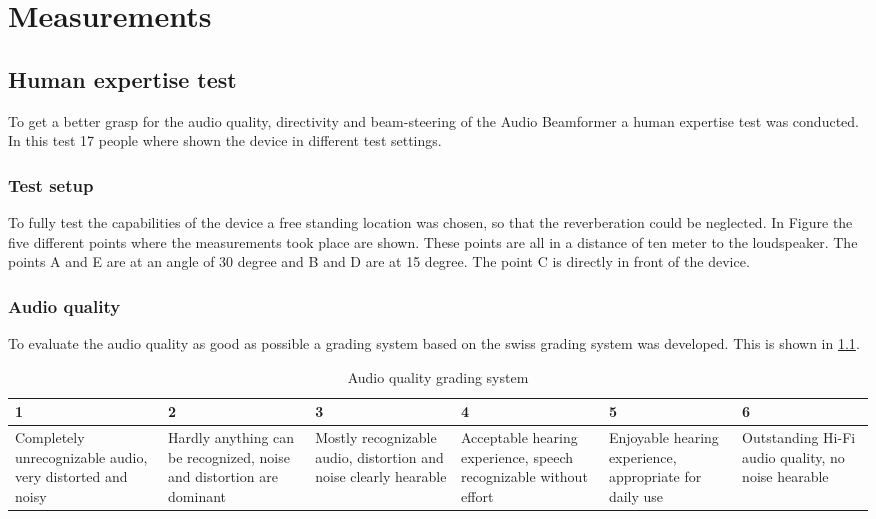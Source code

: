 \chapter{Measurements}
\section{Human expertise test}
To get a better grasp for the audio quality, directivity and beam-steering of the Audio Beamformer a human expertise test was conducted. In this test 17 people where shown the device in different test settings.
\subsection{Test setup}
To fully test the capabilities of the device a free standing location was chosen, so that the reverberation could be neglected. In Figure  the five different points where the measurements took place are shown. These points are all in a distance of ten meter to the loudspeaker. The points A and E are at an angle of 30 degree and B and D are at 15 degree. The point C is directly in front of the device.  
\subsection{Audio quality}
To evaluate the audio quality as good as possible a grading system based on the swiss grading system was developed. This is shown in \ref{6.1.2_tab:audio_quality}.

\begin{center}
\begin{table}
\centering
\begin{tabular}{ |m{2.2cm}|m{2.2cm}|m{2.2cm}|m{2.2cm}|m{2.2cm}|m{2.2cm}|}
  \hline 
  1 & 2 & 3 & 4 & 5 & 6\\ 
  \hline
 Completely unrecognizable audio, very distorted and noisy & Hardly anything can be recognized, noise and distortion are dominant & Mostly recognizable audio, distortion and noise clearly hearable &  Acceptable hearing experience, speech recognizable without effort & Enjoyable hearing experience, appropriate for daily use &  Outstanding Hi-Fi audio quality, no noise hearable \\
 \hline
\end{tabular}
\caption{Audio quality grading system}
\label{6.1.2_tab:audio_quality}
\end{table}
\end{center}

